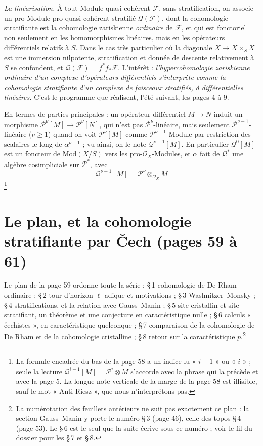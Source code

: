 \documentclass[11pt,a4paper]{article}
\begin{document}
\emph{La linéarisation.} À tout Module quasi-cohérent $\mathcal{F}$, sans
stratification, on associe un pro-Module pro-quasi-cohérent stratifié
$\mathcal{Q}(\mathcal{F})$, dont la cohomologie stratifiante est la
cohomologie zariskienne \emph{ordinaire} de $\mathcal{F}$, et qui est
fonctoriel non seulement en les homomorphismes linéaires, mais en les
opérateurs différentiels relatifs à $S$. Dans le cas très particulier où la
diagonale $X \to X \times_S X$ est une immersion nilpotente, stratification
et donnée de descente relativement à $S$ se confondent, et
$\mathcal{Q}(\mathcal{F}) = f^{*}f_{*}\mathcal{F}$. L'intérêt : \emph{l'hypercohomologie
zariskienne ordinaire d'un complexe d'opérateurs différentiels s'interprète
comme la cohomologie stratifiante d'un complexe de faisceaux stratifiés, à
différentielles linéaires.} C'est le programme que réalisent, l'été suivant,
les pages 4 à 9.

En termes de parties principales : un opérateur différentiel $M \to N$
induit un morphisme $\mathcal{P}^{\nu}[M] \to \mathcal{P}^{\nu}[N]$, qui n'est
pas $\mathcal{P}^{\nu}$-linéaire, mais seulement $\mathcal{P}^{\nu-1}$-linéaire
($\nu \geq 1$) quand on voit $\mathcal{P}^{\nu}[M]$ comme
$\mathcal{P}^{\nu-1}$-Module par restriction des scalaires le long de
$\alpha^{\nu-1}$ ; vu ainsi, on le note $\mathcal{Q}^{\nu-1}[M]$. En
particulier $\mathcal{Q}^{0}[M]$ est un foncteur de $\mathrm{Mod}(X/S)$ vers
les pro-$\mathcal{O}_X$-Modules, et $\alpha$ fait de $\mathcal{Q}^{*}$ une
algèbre cosimpliciale sur $\mathcal{P}^{*}$, avec
\[
  \boxed{\;\mathcal{Q}^{\nu-1}[M] = \mathcal{P}^{\nu} \otimes_{\mathcal{O}_X} M\;}
\]
\footnote{La formule encadrée du bas de la page 58 a un indice lu « $i-1$ »
ou « $i$ » ; seule la lecture $\mathcal{Q}^{i-1}[M] = \mathcal{P}^{i} \otimes
M$ s'accorde avec la phrase qui la précède et avec la page 5. La longue note
verticale de la marge de la page 58 est illisible, sauf le mot
« Anti-Riesz », que nous n'interprétons pas.}

\section*{Le plan, et la cohomologie stratifiante par Čech (pages 59 à 61)}

Le plan de la page 59 ordonne toute la série : §\,1 cohomologie de De Rham
ordinaire ; §\,2 tour d'horizon $\ell$-adique et motivations ; §\,3
Washnitzer--Monsky ; §\,4 stratifications, et la relation avec Gauss--Manin ;
§\,5 site cristallin et site stratifiant, un théorème et une conjecture en
caractéristique nulle ; §\,6 calculs « čechistes », en caractéristique
quelconque ; §\,7 comparaison de la cohomologie de De Rham et de la
cohomologie cristalline ; §\,8 retour sur la caractéristique $p$.\footnote{La
numérotation des feuillets antérieurs ne suit pas exactement ce plan : la
section Gauss--Manin y porte le numéro §\,3 (page 46), celle des topos
§\,4 (page 53). Le §\,6 est le seul que la suite écrive sous ce numéro ; voir
le fil du dossier pour les §\,7 et §\,8.}
\end{document}
